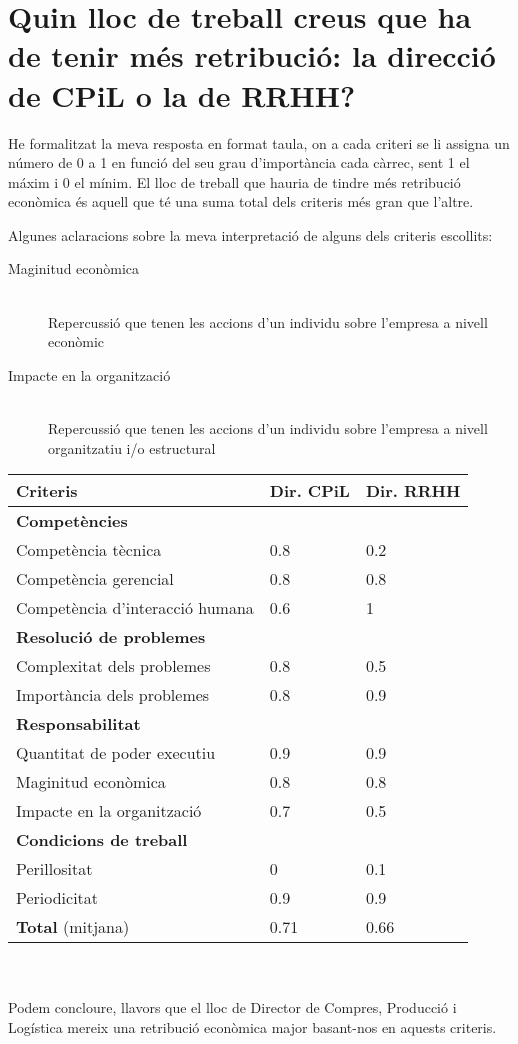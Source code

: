 \section{Quin lloc de treball creus que ha de tenir més retribució: la direcció de CPiL o la de RRHH?}

He formalitzat la meva resposta en format taula, on a cada criteri se li assigna un número de 0 a 1 en funció del seu grau d'importància  cada càrrec, sent 1 el máxim i 0 el mínim. El lloc de treball que hauria de tindre més retribució econòmica és aquell que té una suma total dels criteris més gran que l'altre.

Algunes aclaracions sobre la meva interpretació de alguns dels criteris escollits:

\begin{description}
  \item[Maginitud econòmica]
  \hfill \\
  Repercussió que tenen les accions d'un individu sobre l'empresa a nivell econòmic
  \item[Impacte en la organització]
  \hfill \\
  Repercussió que tenen les accions d'un individu sobre l'empresa a nivell organitzatiu i/o estructural
\end{description}

\begin{tabular}{p{8cm} | p{2cm} | p{2cm}}
  \textbf{Criteris} & \textbf{Dir. CPiL} & \textbf{Dir. RRHH} \\
  \hline
  \hline
  \multicolumn{3}{l}{\textbf{Competències}} \\
  \hline
  Competència tècnica & 0.8 & 0.2 \\
  Competència gerencial & 0.8 & 0.8 \\
  Competència d'interacció humana & 0.6 & 1 \\
  \hline
  \multicolumn{3}{l}{\textbf{Resolució de problemes}} \\
  \hline
  Complexitat dels problemes & 0.8 & 0.5 \\
  Importància dels problemes & 0.8 & 0.9 \\
  \hline
  \multicolumn{3}{l}{\textbf{Responsabilitat}} \\
  \hline
  Quantitat de poder executiu & 0.9 & 0.9 \\
  Maginitud econòmica & 0.8 & 0.8 \\
  Impacte en la organització & 0.7 & 0.5 \\
  \hline
  \multicolumn{3}{l}{\textbf{Condicions de treball}} \\
  \hline
  Perillositat & 0 & 0.1 \\
  Periodicitat & 0.9 & 0.9 \\
  \hline
  \hline
  \textbf{Total} (mitjana) & 0.71 & 0.66 \\
  \hline
\end{tabular}
\\ \\
Podem concloure, llavors que el lloc de Director de Compres, Producció i Logística mereix una retribució econòmica major basant-nos en aquests criteris.
